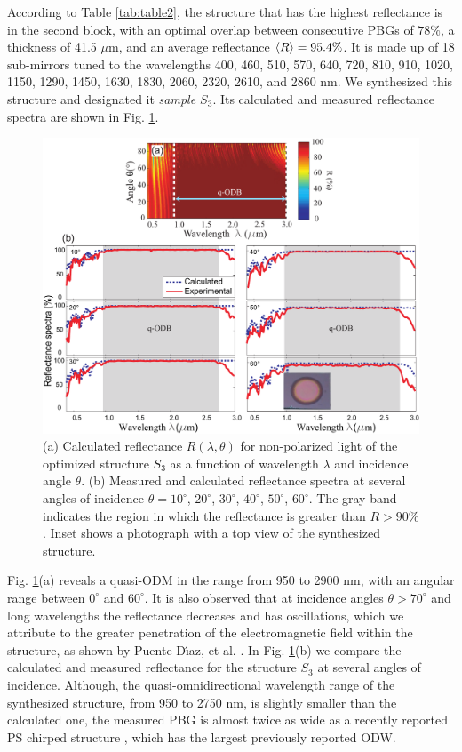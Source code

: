 \documentclass[a4paper,fleqn]{cas-sc}
\begin{document}
According to Table \ref{tab:table2}, the structure that has the highest
reflectance is in the second block, with an optimal overlap between
consecutive PBGs of $78\%$, a thickness of
41.5 $\mu$m, and an average reflectance $\braket{R}=95.4\%$. It is made up
of 18 sub-mirrors tuned to the wavelengths
400, 460, 510, 570, 640, 720, 810, 910, 1020, 1150, 1290, 1450,
1630, 1830, 2060, 2320, 2610, and 2860 nm.
We synthesized this structure and designated it {\em sample $S_3$}.
Its calculated and measured
reflectance spectra are shown in Fig. \ref{Fig3}.
\begin{figure}
        \begin{center}
                \includegraphics[width=\textwidth]
                {F3Alternativa.pdf}
        \end{center}
        \caption{ (a) Calculated reflectance $R(\lambda,\theta)$ for non-polarized light of the optimized structure $S_3$
                as a function of wavelength $\lambda$ and incidence angle
                $\theta$. (b) Measured and calculated reflectance spectra at several
                angles of incidence $\theta=10^\circ$, $20^\circ$,
                $30^\circ$, $40^\circ$, $50^\circ$, $60^\circ$. The gray band indicates
                the region in which the reflectance is greater than $R>90\%$.  Inset shows a
                photograph with a top view of the synthesized structure.}
        \label{Fig3}
\end{figure}

Fig. \ref{Fig3}(a) reveals a quasi-ODM
in the range from 950 to 2900 nm, with an angular range between $0^\circ$ and
$60^\circ$. It is also observed that at incidence angles $\theta
>70^\circ$ and long
wavelengths the reflectance decreases and has oscillations, which we attribute to the
greater penetration of the electromagnetic field within the structure, as shown by
Puente-D\'{\i}az, et al. \cite{Puente2020}. In Fig. \ref{Fig3}(b) we compare the
calculated and measured reflectance for the structure $S_3$ at several angles of
incidence. Although, the quasi-omnidirectional wavelength range of
the synthesized structure, from 950 to 2750 nm, is slightly smaller than the calculated
one, the measured PBG is almost twice as wide
as a recently reported PS chirped structure \cite{Chavez2020}, which
has the largest previously reported ODW.
\end{document}
